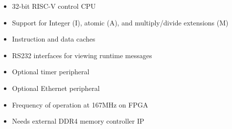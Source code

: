%

\begin{itemize}
\item 32-bit RISC-V control CPU
\item Support for Integer (I), atomic (A), and multiply/divide extensions (M)
\item Instruction and data caches
\item RS232 interfaces for viewing runtime messages
\item Optional timer peripheral
\item Optional Ethernet peripheral
\item Frequency of operation at 167MHz on FPGA
\item Needs external DDR4 memory controller IP
\end{itemize}
